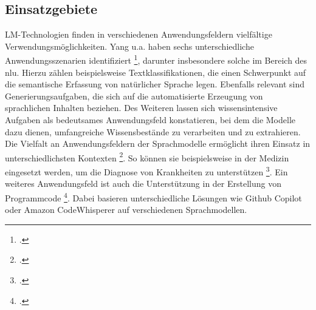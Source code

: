 \subsection{Einsatzgebiete} \label{sec:einsatzgebiete}
LM-Technologien finden in verschiedenen Anwendungsfeldern vielfältige Verwendungsmöglichkeiten. Yang u.a. haben sechs unterschiedliche Anwendungsszenarien identifiziert \footcite[Vgl.][S. 6 ff.]{yang2023harnessing}, darunter insbesondere solche im Bereich des \ac{nlu}. Hierzu zählen beispielsweise Textklassifikationen, die einen Schwerpunkt auf die semantische Erfassung von natürlicher Sprache legen. Ebenfalls relevant sind Generierungsaufgaben, die sich auf die automatisierte Erzeugung von sprachlichen Inhalten beziehen. Des Weiteren lassen sich wissensintensive Aufgaben als bedeutsames Anwendungsfeld konstatieren, bei dem die Modelle dazu dienen, umfangreiche Wissensbestände zu verarbeiten und zu extrahieren.
Die Vielfalt an Anwendungsfeldern der Sprachmodelle ermöglicht ihren Einsatz in unterschiedlichsten Kontexten \footcite[Vgl.][S. 6 ff.]{yang2023harnessing}.
So können sie beispielsweise in der Medizin eingesetzt werden, um die Diagnose von Krankheiten zu unterstützen \footcite[Vgl.][S. 10 ff.]{Peng_2023}.
Ein weiteres Anwendungsfeld ist auch die Unterstützung in der Erstellung von Programmcode \footcite[Vgl.][S. 3 ff.]{yetiştiren2023evaluating}.
Dabei basieren unterschiedliche Lösungen wie Github Copilot oder Amazon CodeWhisperer auf verschiedenen Sprachmodellen.

